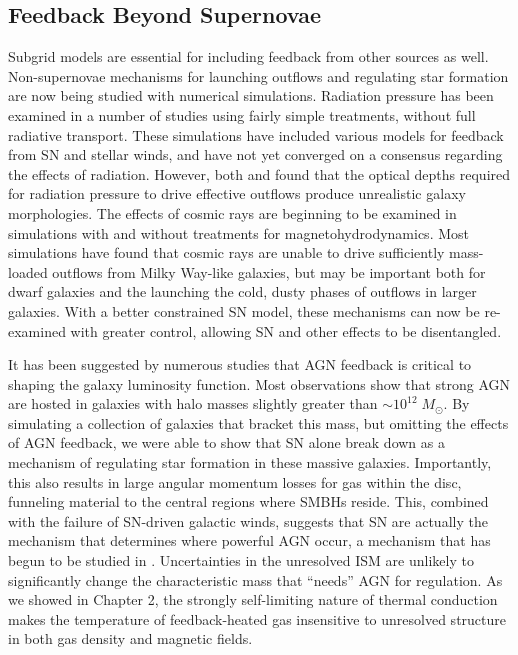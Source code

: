 \subsection{Feedback Beyond Supernovae}
Subgrid models are essential for including feedback from other sources as well.
Non-supernovae mechanisms for launching outflows and regulating star formation
are now being studied with numerical simulations.  Radiation pressure has been
examined in a number of studies \citep{Hopkins2014,Roskar2014,Agertz2015} using
fairly simple treatments, without full radiative transport.  These simulations
have included various models for feedback from SN and stellar winds, and have
not yet converged on a consensus regarding the effects of radiation.  However,
both \citet{Roskar2014} and \citet{Agertz2015} found that the optical depths
required for radiation pressure to drive effective outflows produce unrealistic
galaxy morphologies.  The effects of cosmic rays are beginning to be examined in
simulations with \citep{Girichidis2015} and without
\citep{Jubelgas2008,Booth2013} treatments for magnetohydrodynamics.  Most
simulations have found that cosmic rays are unable to drive sufficiently
mass-loaded outflows from Milky Way-like galaxies, but may be important both for
dwarf galaxies and the launching the cold, dusty phases of outflows in larger
galaxies.  With a better constrained SN model, these mechanisms can now be
re-examined with greater control, allowing SN and other effects to be
disentangled.

It has been suggested by numerous studies \citep{Benson2003,Bower2006} that AGN
feedback is critical to shaping the galaxy luminosity function.  Most
observations \citep{Kauffmann2003b} show that strong AGN are hosted in galaxies
with halo masses slightly greater than $\sim10^{12}\;M_\odot$.  By simulating a
collection of galaxies that bracket this mass, but omitting the effects of AGN
feedback, we were able to show that SN alone break down as a mechanism of
regulating star formation in these massive galaxies.  Importantly, this also
results in large angular momentum losses for gas within the disc, funneling
material to the central regions where SMBHs reside.  This, combined with the
failure of SN-driven galactic winds, suggests that SN are actually the mechanism
that determines where powerful AGN occur, a mechanism that has begun to be studied in
\citet{Bower2016}.  Uncertainties in the unresolved ISM are unlikely to
significantly change the characteristic mass that ``needs'' AGN for regulation.
As we showed in Chapter 2, the strongly self-limiting nature of thermal
conduction makes the temperature of feedback-heated gas insensitive to unresolved
structure in both gas density and magnetic fields.

